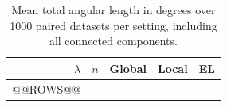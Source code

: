 \begin{table}[htbp]
\centering
\caption[Angular lengths of circular confidence sets]{Mean total angular
length in degrees over 1000 paired datasets per setting, including all
connected components.}
\label{tab:circle-lengths}
\begin{tabular}{@{}rrrrr@{}}
\hline
$\lambda$ & $n$ & Global & Local & EL \\
\hline
@@ROWS@@
\end{tabular}
\end{table}
